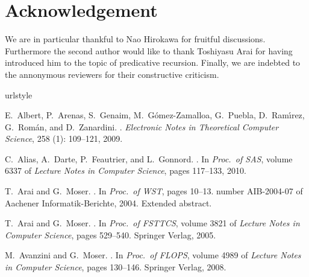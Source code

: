 \documentclass{LMCS}
\begin{document}
\section*{Acknowledgement}

We are in particular thankful to Nao Hirokawa for fruitful discussions.
Furthermore the second author would like to thank Toshiyasu Arai for having
introduced him to the topic of predicative recursion.
Finally, we are indebted to the annonymous reviewers for their constructive criticism.


\begin{thebibliography}{59}
\providecommand{\natexlab}[1]{#1}
\providecommand{\url}[1]{\texttt{#1}}
\expandafter\ifx\csname urlstyle\endcsname\relax
  \providecommand{\doi}[1]{doi: #1}\else
  \providecommand{\doi}{doi: \begingroup \urlstyle{rm}\Url}\fi

E.~Albert, P.~Arenas, S.~Genaim, M.~G{\'o}mez-Zamalloa, G.~Puebla,
  D.~Ram\'{\i}rez, G.~Rom{\'a}n, and D.~Zanardini.
.
\newblock \emph{Electronic Notes in Theoretical Computer Science}, 258
  (1): 109--121, 2009.

C.~Alias, A.~Darte, P.~Feautrier, and L.~Gonnord.
.
\newblock In \emph{Proc.\ of  SAS}, volume 6337 of \emph{Lecture Notes
  in Computer Science}, pages 117--133, 2010.

T.~Arai and G.~Moser.
.
\newblock In \emph{Proc.\ of  WST}, pages 10--13. number AIB-2004-07 of
  Aachener Informatik-Berichte, 2004.
\newblock Extended abstract.

T.~Arai and G.~Moser.
.
\newblock In \emph{{Proc.\ of  FSTTCS}}, volume 3821 of \emph{Lecture
  Notes in Computer Science}, pages 529--540. Springer Verlag, 2005.

M.~Avanzini and G.~Moser.
.
\newblock In \emph{Proc.\ of  FLOPS}, volume 4989 of \emph{Lecture Notes
  in Computer Science}, pages 130--146. Springer Verlag, 2008.


\end{thebibliography}
\end{document}

